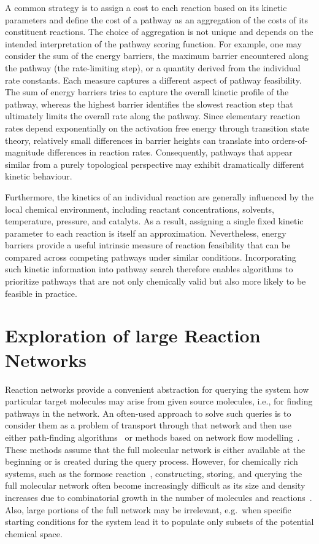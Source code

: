 A common strategy is to assign a cost to each reaction based on its kinetic parameters and define the cost of a pathway as an aggregation of the costs of its constituent reactions. The choice of aggregation is not unique and depends on the intended interpretation of the pathway scoring function. For example, one may consider the sum of the energy barriers, the maximum barrier encountered along the pathway (the rate-limiting step), or a quantity derived from the individual rate constants. Each measure captures a different aspect of pathway feasibility. The sum of energy barriers tries to capture the overall kinetic profile of the pathway, whereas the highest barrier identifies the slowest reaction step that ultimately limits the overall rate along the pathway. Since elementary reaction rates depend exponentially on the activation free energy through transition state theory, relatively small differences in barrier heights can translate into orders-of-magnitude differences in reaction rates. Consequently, pathways that appear similar from a purely topological perspective may exhibit dramatically different kinetic behaviour.

Furthermore, the kinetics of an individual reaction are generally influenced by the local chemical environment, including reactant concentrations, solvents, temperature, pressure, and catalyts. As a result, assigning a single fixed kinetic parameter to each reaction is itself an approximation. Nevertheless, energy barriers provide a useful intrinsic measure of reaction feasibility that can be compared across competing pathways under similar conditions. Incorporating such kinetic information into pathway search therefore enables algorithms to prioritize pathways that are not only chemically valid but also more likely to be feasible in practice.

\section{Exploration of large Reaction Networks}

Reaction networks provide a convenient abstraction for querying the system how particular target molecules may arise from given source molecules, i.e., for finding pathways in the network. An often-used approach to solve such queries is to consider them as a problem of transport through that network and then use either path-finding algorithms~\cite{bfs_crn,bfs_crn2,dfs_crn,dfs_crn2} or methods based on network flow modelling~\cite{jakob_integer_hyperflows}. These methods assume that the full molecular network is either available at the beginning or is created during the query process.
However, for chemically rich systems, such as the formose reaction~\cite{complex_formose,complex_formose2}, constructing, storing, and querying the full molecular network often become increasingly difficult as its size and density increases due to combinatorial growth in the number of molecules and reactions~\cite{large_crn,large_crn2}.
Also, large portions of the full network may be irrelevant, e.g.\ when specific starting conditions for the system lead it to populate only subsets of the potential chemical space.

